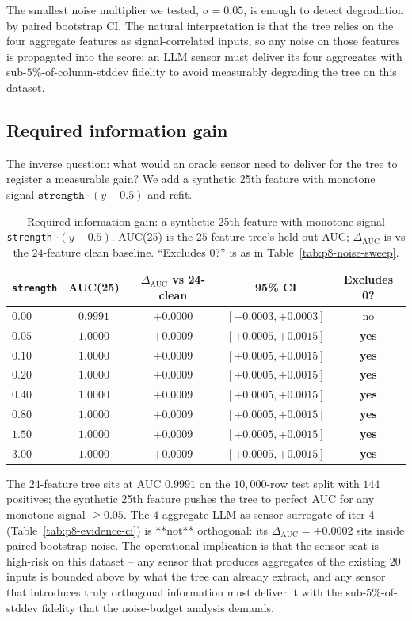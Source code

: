 \documentclass{article}
\providecommand{\tableref}[1]{Table~\ref{#1}}
\begin{document}
The smallest noise multiplier we tested, $\sigma = 0.05$, is enough to
detect degradation by paired bootstrap CI. The natural interpretation is
that the tree relies on the four aggregate features as signal-correlated
inputs, so any noise on those features is propagated into the score; an
LLM sensor must deliver its four aggregates with sub-$5\%$-of-column-stddev
fidelity to avoid measurably degrading the tree on this dataset.

\subsection{Required information gain}

The inverse question: what would an oracle sensor need to deliver for
the tree to register a measurable gain? We add a synthetic 25th feature
with monotone signal $\texttt{strength} \cdot (y - 0.5)$ and refit.

\begin{table}[t]
\centering
\small
\caption{Required information gain: a synthetic 25th feature with
monotone signal \texttt{strength} $\cdot(y - 0.5)$. AUC(25) is the
$25$-feature tree's held-out AUC; $\Delta_{\text{AUC}}$ is vs the
$24$-feature clean baseline. ``Excludes 0?'' is as in
\tableref{tab:p8-noise-sweep}.}
\label{tab:p8-info-gain}
\begin{tabular}{lcccc}
\toprule
\texttt{strength} & AUC(25) & $\Delta_{\text{AUC}}$ vs 24-clean & 95\% CI & Excludes 0? \\
\midrule
$0.00$ & $0.9991$ & $+0.0000$ & $[-0.0003, +0.0003]$ & no \\
$0.05$ & $1.0000$ & $+0.0009$ & $[+0.0005, +0.0015]$ & \textbf{yes} \\
$0.10$ & $1.0000$ & $+0.0009$ & $[+0.0005, +0.0015]$ & \textbf{yes} \\
$0.20$ & $1.0000$ & $+0.0009$ & $[+0.0005, +0.0015]$ & \textbf{yes} \\
$0.40$ & $1.0000$ & $+0.0009$ & $[+0.0005, +0.0015]$ & \textbf{yes} \\
$0.80$ & $1.0000$ & $+0.0009$ & $[+0.0005, +0.0015]$ & \textbf{yes} \\
$1.50$ & $1.0000$ & $+0.0009$ & $[+0.0005, +0.0015]$ & \textbf{yes} \\
$3.00$ & $1.0000$ & $+0.0009$ & $[+0.0005, +0.0015]$ & \textbf{yes} \\
\bottomrule
\end{tabular}
\end{table}

The $24$-feature tree sits at AUC $0.9991$ on the $10{,}000$-row
test split with $144$ positives; the synthetic 25th feature pushes
the tree to perfect AUC for any monotone signal $\ge 0.05$. The
$4$-aggregate LLM-as-sensor surrogate of iter-4
(\tableref{tab:p8-evidence-ci}) is **not** orthogonal: its $\Delta
_{\text{AUC}} = +0.0002$ sits inside paired bootstrap noise. The
operational implication is that the sensor seat is high-risk on this
dataset -- any sensor that produces aggregates of the existing
$20$ inputs is bounded above by what the tree can already extract,
and any sensor that introduces truly orthogonal information must
deliver it with the sub-$5\%$-of-stddev fidelity that the
noise-budget analysis demands.
\end{document}

